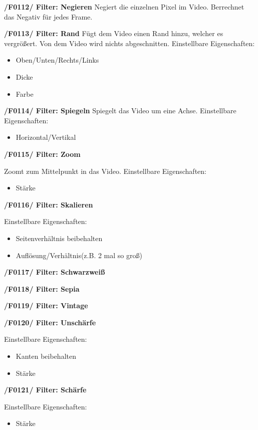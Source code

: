\documentclass[parskip=full]{scrartcl}
\begin{document}
\textbf{/F0112/ Filter: Negieren}
Negiert die einzelnen Pixel im Video.
Berrechnet das Negativ für jedes Frame.

\textbf{/F0113/ Filter: Rand}
Fügt dem Video einen Rand hinzu, welcher es vergrößert. Von dem Video wird nichts abgeschnitten.
Einstellbare Eigenschaften:
\begin{itemize}
\item Oben/Unten/Rechts/Links
\item Dicke
\item Farbe
\end{itemize}

\textbf{/F0114/ Filter: Spiegeln}
Spiegelt das Video um eine Achse.
Einstellbare Eigenschaften:
\begin{itemize}
\item Horizontal/Vertikal
\end{itemize}

\textbf{/F0115/ Filter: Zoom}

Zoomt zum Mittelpunkt in das Video.
Einstellbare Eigenschaften:
\begin{itemize}
\item Stärke
\end{itemize}

\textbf{/F0116/ Filter: Skalieren}

Einstellbare Eigenschaften:
\begin{itemize}
\item Seitenverhältnis beibehalten
\item Auflösung/Verhältnis(z.B. 2 mal so groß)
\end{itemize}

\textbf{/F0117/ Filter: Schwarzweiß}

\textbf{/F0118/ Filter: Sepia}

\textbf{/F0119/ Filter: Vintage}

\textbf{/F0120/ Filter: Unschärfe}

Einstellbare Eigenschaften:
\begin{itemize}
\item Kanten beibehalten
\item Stärke
\end{itemize}

\textbf{/F0121/ Filter: Schärfe}

Einstellbare Eigenschaften:
\begin{itemize}
\item Stärke
\end{itemize}
\end{document}
